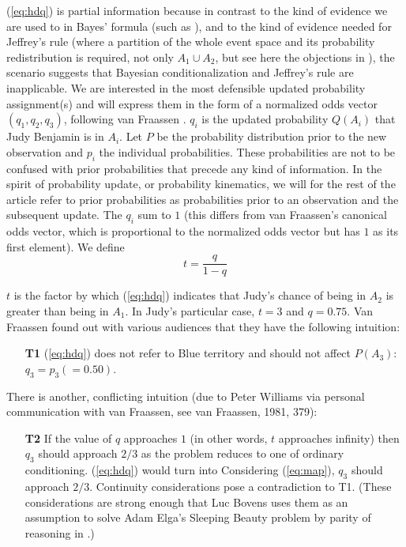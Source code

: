 \documentclass[12pt]{article}
\begin{document}
\nial ({\ref{eq:hdq}}) is partial information because in contrast to
the kind of evidence we are used to in Bayes' formula (such as
), and to the kind of evidence needed
for Jeffrey's rule (where a partition of the whole event space and its
probability redistribution is required, not only $A_{1}\cup{}A_{2}$,
but see here the objections in ), the
scenario suggests that Bayesian conditionalization and Jeffrey's rule
are inapplicable. We are interested in the most defensible updated
probability assignment(s) and will express them in the form of a
normalized odds vector $(q_{1},q_{2},q_{3})$, following van Fraassen
. $q_{i}$ is the updated probability $Q(A_{i})$
that Judy Benjamin is in $A_{i}$. Let $P$ be the probability
distribution prior to the new observation and $p_{i}$ the individual
 probabilities. These probabilities are not to be
confused with prior probabilities that precede any kind of
information. In the spirit of probability update, or probability
kinematics, we will for the rest of the article refer to prior
probabilities as probabilities prior to an observation and the
subsequent update. The $q_{i}$ sum to $1$ (this differs from van
Fraassen's canonical odds vector, which is proportional to the
normalized odds vector but has $1$ as its first element). We define
\begin{displaymath}
  t=\frac{q}{1-q}
\end{displaymath}

\nial $t$ is the factor by which ({\ref{eq:hdq}}) indicates that
Judy's chance of being in $A_{2}$ is greater than being in $A_{1}$. In
Judy's particular case, $t=3$ and $q=0.75$. Van Fraassen found out
with various audiences that they have the following intuition:

\begin{enumerate}
  \item[\textbf{T1}] ({\ref{eq:hdq}}) does not refer to Blue territory and
  should not affect $P(A_{3})$: $q_{3}=p_{3}(=0.50)$.
\end{enumerate}

\nial There is another, conflicting intuition (due to Peter Williams via
personal communication with van Fraassen, 
see van Fraassen, 1981, 379)\nonsc{}:

\begin{enumerate}
\item[\textbf{T2}] If the value of $q$ approaches $1$ (in other words,
  $t$ approaches infinity) then $q_{3}$ should approach $2/3$ as the
  problem reduces to one of ordinary conditioning. ({\ref{eq:hdq}})
  would turn into  Considering
  ({\ref{eq:map}}), $q_{3}$ should approach $2/3$. Continuity
  considerations pose a contradiction to T1. (These considerations are
  strong enough that Luc Bovens uses them as an assumption to solve
  Adam Elga's Sleeping Beauty problem by parity of reasoning in
  .)
\end{enumerate}
\end{document}
